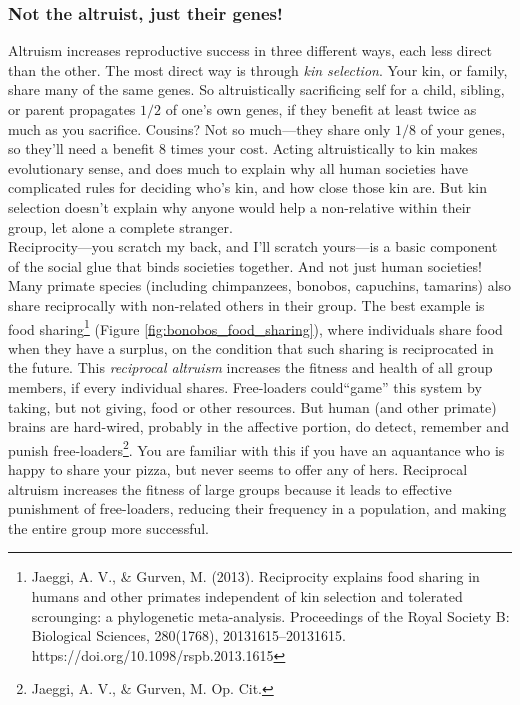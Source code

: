 \documentclass[amstex,12pt]{book}
\begin{document}
\subsubsection{Not the altruist, just their genes!}
Altruism increases reproductive success in three different ways, each less direct than the other. The most direct way is through \emph{kin selection}. Your kin, or family, share many of the same genes. So altruistically sacrificing self for a child, sibling, or parent propagates $1/2$ of one's own genes, if they benefit at least twice as much as you sacrifice. Cousins? Not so much---they share only $1/8$ of your genes, so they'll need a benefit 8 times your cost. Acting altruistically to kin makes evolutionary sense, and does much to explain why all human societies have complicated rules for deciding who's kin, and how close those kin are. But kin selection doesn't explain why anyone would help a non-relative within their group, let alone a complete stranger. \\

Reciprocity---you scratch my back, and I'll scratch yours---is a basic component of the social glue that binds societies together. And not just human societies! Many primate species (including chimpanzees, bonobos, capuchins, tamarins) also share reciprocally with non-related others in their group. The best example is food sharing\footnote{Jaeggi, A. V., \& Gurven, M. (2013). Reciprocity explains food sharing in humans and other primates independent of kin selection and tolerated scrounging: a phylogenetic meta-analysis. Proceedings of the Royal Society B: Biological Sciences, 280(1768), 20131615–20131615. https://doi.org/10.1098/rspb.2013.1615} (Figure \ref{fig:bonobos_food_sharing}), where individuals share food when they have a surplus, on the condition that such sharing is reciprocated in the future. This \emph{reciprocal altruism} increases the fitness and health of all group members, if every individual shares. Free-loaders could``game'' this system by taking, but not giving, food or other resources. But human (and other primate) brains are hard-wired, probably in the affective portion, do detect, remember and punish free-loaders\footnote{Jaeggi, A. V., \& Gurven, M. Op. Cit.}. You are familiar with this if you have an aquantance who is happy to share your pizza, but never seems to offer any of hers. Reciprocal altruism increases the fitness of large groups because it leads to effective punishment of free-loaders, reducing their frequency in a population, and making the entire group more successful.\\
 
\end{document}
